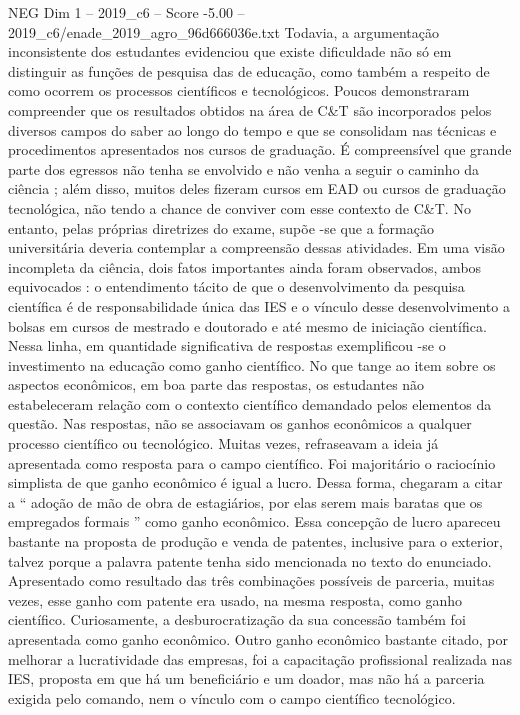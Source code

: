 \begin{textsample}{NEG Dim 1 – 2019\_c6 – Score -5.00 – 2019\_c6/enade\_2019\_agro\_96d666036e.txt}
Todavia, a argumentação inconsistente dos estudantes evidenciou que existe dificuldade não só em distinguir as funções de pesquisa das de educação, como também a respeito de como ocorrem os processos científicos e tecnológicos.
Poucos demonstraram compreender que os resultados obtidos na área de C\&T são incorporados pelos diversos campos do saber ao longo do tempo e que se consolidam nas técnicas e procedimentos apresentados nos cursos de graduação.
É compreensível que grande parte dos egressos não tenha se envolvido e não venha a seguir o caminho da ciência ; além disso, muitos deles fizeram cursos em EAD ou cursos de graduação tecnológica, não tendo a chance de conviver com esse contexto de C\&T.
No entanto, pelas próprias diretrizes do exame, supõe -se que a formação universitária deveria contemplar a compreensão dessas atividades.
Em uma visão incompleta da ciência, dois fatos importantes ainda foram observados, ambos equivocados : o entendimento tácito de que o desenvolvimento da pesquisa científica é de responsabilidade única das IES e o vínculo desse desenvolvimento a bolsas em cursos de mestrado e doutorado e até mesmo de iniciação científica.
Nessa linha, em quantidade significativa de respostas exemplificou -se o investimento na educação como ganho científico.
No que tange ao item sobre os aspectos econômicos, em boa parte das respostas, os estudantes não estabeleceram relação com o contexto científico demandado pelos elementos da questão.
Nas respostas, não se associavam os ganhos econômicos a qualquer processo científico ou tecnológico.
Muitas vezes, refraseavam a ideia já apresentada como resposta para o campo científico.
Foi majoritário o raciocínio simplista de que ganho econômico é igual a lucro.
Dessa forma, chegaram a citar a “ adoção de mão de obra de estagiários, por elas serem mais baratas que os empregados formais ” como ganho econômico.
Essa concepção de lucro apareceu bastante na proposta de produção e venda de patentes, inclusive para o exterior, talvez porque a palavra patente tenha sido mencionada no texto do enunciado.
Apresentado como resultado das três combinações possíveis de parceria, muitas vezes, esse ganho com patente era usado, na mesma resposta, como ganho científico.
Curiosamente, a desburocratização da sua concessão também foi apresentada como ganho econômico.
Outro ganho econômico bastante citado, por melhorar a lucratividade das empresas, foi a capacitação profissional realizada nas IES, proposta em que há um beneficiário e um doador, mas não há a parceria exigida pelo comando, nem o vínculo com o campo científico tecnológico.

\end{textsample}
